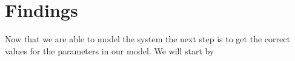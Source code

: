 \chapter{Findings}

Now that we are able to model the system the next step is to get the correct values for the parameters in our model. We will start by 